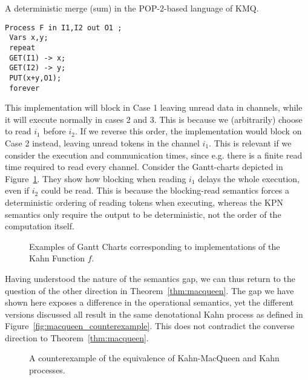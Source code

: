 \begin{listing}
	\caption{A deterministic merge (sum) in the POP-2-based language of \ac{KMQ}.}
	\label{lst:detmerge}
\begin{verbatim}
Process F in I1,I2 out O1 ;
 Vars x,y;
 repeat
 GET(I1) -> x;
 GET(I2) -> y;
 PUT(x+y,O1);
 forever
\end{verbatim}
\end{listing}

This implementation will block in Case 1 leaving unread data in channels, while it will execute normally in cases 2 and 3.
This is because we (arbitrarily) choose to read $i_1$ before $i_2$.
If we reverse this order, the implementation would block on Case 2 instead, leaving unread tokens in the channel $i_1$.
This is relevant if we consider the execution and communication times, since e.g. there is a finite read time required to read every channel. 
Consider the Gantt-charts depicted in Figure~\ref{fig:macqueen_example_gantt}. They show how blocking when reading $i_1$ delays the whole execution, even if $i_2$ could be read.
This is because the blocking-read semantics forces a deterministic ordering of reading tokens when executing, whereas the \ac{KPN} semantics only require the output to be deterministic, not the order of the computation itself.

\begin{figure}[h]
   \resizebox{1.00\textwidth}{!}{}
	\caption{Examples of Gantt Charts corresponding to implementations of the Kahn Function $f$.}
	\label{fig:macqueen_example_gantt}
\end{figure}

Having understood the nature of the semantics gap, we can thus return to the question of the other direction in Theorem~\ref{thm:macqueen}.
The gap we have shown here exposes a difference in the operational semantics, yet the different versions discussed all result in the same denotational Kahn process as defined in Figure~\ref{fig:macqueen_counterexample}.
This does not contradict the converse direction to Theorem~\ref{thm:macqueen}.

\begin{figure}[h]
   \resizebox{0.65\textwidth}{!}{}
	\caption{A counterexample of the equivalence of Kahn-MacQueen and Kahn processes.}
	\label{fig:macqueen_proper_counterexample}
\end{figure}

